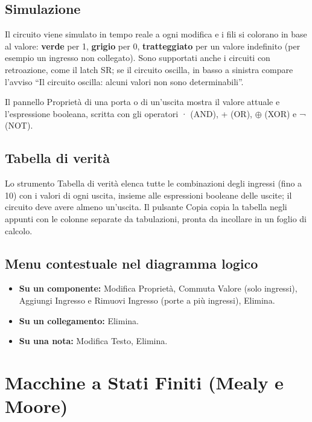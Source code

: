 \documentclass[a4paper,11pt]{article}
\newcommand\mediumweight{\fontseries{mb}\selectfont}
\newcommand\currenticon{book}
\newcommand\tocicon{book}
\newcommand\sectionicon[1]{%
  \renewcommand\currenticon{#1}%
  \addtocontents{toc}{\gdef\protect\tocicon{#1}}}
\newcommand\uielement[1]{{\mediumweight #1}}
\begin{document}
\subsection{Simulazione}

Il circuito viene simulato in tempo reale a ogni modifica e i fili si colorano in base al valore:
\textbf{verde} per 1, \textbf{grigio} per 0, \textbf{tratteggiato} per un valore indefinito (per
esempio un ingresso non collegato). Sono supportati anche i circuiti con retroazione, come il
latch SR; se il circuito oscilla, in basso a sinistra compare l'avviso ``Il circuito oscilla:
alcuni valori non sono determinabili''.

Il pannello Proprietà di una porta o di un'uscita mostra il valore attuale e l'espressione
booleana, scritta con gli operatori · (AND), + (OR), $\oplus$ (XOR) e ¬ (NOT).

\subsection{Tabella di verità}

Lo strumento \uielement{Tabella di verità} elenca tutte le combinazioni degli ingressi (fino a 10)
con i valori di ogni uscita, insieme alle espressioni booleane delle uscite; il circuito deve
avere almeno un'uscita. Il pulsante \uielement{Copia} copia la tabella negli appunti con le
colonne separate da tabulazioni, pronta da incollare in un foglio di calcolo.

\subsection{Menu contestuale nel diagramma logico}

\begin{itemize}
  \item \textbf{Su un componente:} Modifica Proprietà, Commuta Valore (solo ingressi), Aggiungi
        Ingresso e Rimuovi Ingresso (porte a più ingressi), Elimina.
  \item \textbf{Su un collegamento:} Elimina.
  \item \textbf{Su una nota:} Modifica Testo, Elimina.
\end{itemize}

\sectionicon{statemachine}
\section{Macchine a Stati Finiti (Mealy e Moore)}
\label{sec:fsm}
\end{document}
